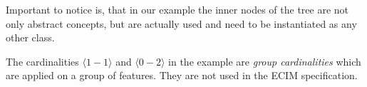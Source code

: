 Important to notice is, that in our example the inner nodes of the tree are not only abstract concepts, but are actually used and need to be instantiated as any other class.

The cardinalities $\langle 1 - 1 \rangle$ and $\langle 0 - 2 \rangle$ in the example are \emph{group cardinalities} which are applied on a group of features. They are not used in the ECIM specification.


 
